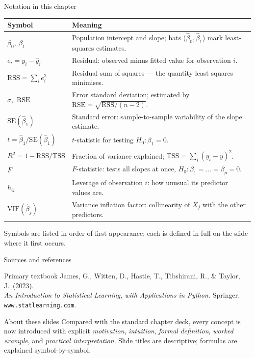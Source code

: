 \documentclass[aspectratio=169,11pt]{beamer}
\begin{document}
\begin{frame}{Notation in this chapter}
  \footnotesize
  \begin{center}
  \begin{tabular}{@{}ll@{}}
    \toprule
    \textbf{Symbol} & \textbf{Meaning} \\
    \midrule
    $\beta_0,\ \beta_1$ & Population intercept and slope; hats ($\hat\beta_0,\hat\beta_1$) mark least-squares estimates. \\
    $e_i = y_i - \hat y_i$ & Residual: observed minus fitted value for observation $i$. \\
    $\mathrm{RSS}=\sum_i e_i^2$ & Residual sum of squares --- the quantity least squares minimises. \\
    $\sigma$,\ $\mathrm{RSE}$ & Error standard deviation; estimated by $\mathrm{RSE}=\sqrt{\mathrm{RSS}/(n-2)}$. \\
    $\mathrm{SE}(\hat\beta_1)$ & Standard error: sample-to-sample variability of the slope estimate. \\
    $t=\hat\beta_1/\mathrm{SE}(\hat\beta_1)$ & $t$-statistic for testing $H_0\colon \beta_1 = 0$. \\
    $R^2 = 1-\mathrm{RSS}/\mathrm{TSS}$ & Fraction of variance explained; $\mathrm{TSS}=\sum_i(y_i-\bar y)^2$. \\
    $F$ & $F$-statistic: tests all slopes at once, $H_0\colon\beta_1=\dots=\beta_p=0$. \\
    $h_{ii}$ & Leverage of observation $i$: how unusual its predictor values are. \\
    $\mathrm{VIF}(\hat\beta_j)$ & Variance inflation factor: collinearity of $X_j$ with the other predictors. \\
    \bottomrule
  \end{tabular}
  \end{center}
  \vspace{2pt}
  {\scriptsize Symbols are listed in order of first appearance; each is defined in full on the slide where it first occurs.}
\end{frame}

\begin{frame}{Sources and references}
  \begin{block}{Primary textbook}
    James, G., Witten, D., Hastie, T., Tibshirani, R., \& Taylor, J.\ (2023).\\
    \emph{An Introduction to Statistical Learning, with Applications in
    Python.} Springer. \texttt{www.statlearning.com}.
  \end{block}
  \begin{block}{About these slides}
    Compared with the standard chapter deck, every concept is now
    introduced with explicit \emph{motivation}, \emph{intuition},
    \emph{formal definition}, \emph{worked example}, and \emph{practical
    interpretation}. Slide titles are descriptive; formulas are
    explained symbol-by-symbol.
  \end{block}
\end{frame}
\end{document}
